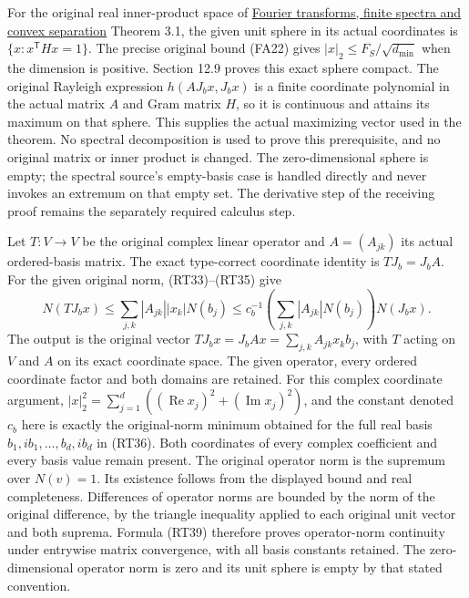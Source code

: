 \documentclass[
  11pt,
]{article}
\begin{document}
For the original real inner-product space of
\href{prerequisite-bridges.pdf}{Fourier transforms, finite spectra and
convex separation} Theorem 3.1, the given unit sphere in its actual
coordinates is \(\{x:x^{\mathsf T}Hx=1\}\). The precise original bound
(FA22) gives \(|x|_2\le F_S/\sqrt{d_{\min}}\) when the dimension is
positive. Section 12.9 proves this exact sphere compact. The original
Rayleigh expression \(h(AJ_bx,J_bx)\) is a finite coordinate polynomial
in the actual matrix \(A\) and Gram matrix \(H\), so it is continuous
and attains its maximum on that sphere. This supplies the actual
maximizing vector used in the theorem. No spectral decomposition is used
to prove this prerequisite, and no original matrix or inner product is
changed. The zero-dimensional sphere is empty; the spectral source's
empty-basis case is handled directly and never invokes an extremum on
that empty set. The derivative step of the receiving proof remains the
separately required calculus step.

Let \(T:V\to V\) be the original complex linear operator and
\(A=(A_{jk})\) its actual ordered-basis matrix. The exact type-correct
coordinate identity is \(TJ_b=J_bA\). For the given original norm,
(RT33)--(RT35) give \[
N(TJ_bx)
\le\sum_{j,k}|A_{jk}||x_k|N(b_j)
\le c_b^{-1}\left(\sum_{j,k}|A_{jk}|N(b_j)\right)N(J_bx).
\tag{RT39}
\] The output is the original vector
\(TJ_bx=J_bAx=\sum_{j,k}A_{jk}x_kb_j\), with \(T\) acting on \(V\) and
\(A\) on its exact coordinate space. The given operator, every ordered
coordinate factor and both domains are retained. For this complex
coordinate argument,
\(|x|_2^2=\sum_{j=1}^d((\operatorname{Re}x_j)^2+(\operatorname{Im}x_j)^2)\),
and the constant denoted \(c_b\) here is exactly the original-norm
minimum obtained for the full real basis \(b_1,ib_1,\ldots,b_d,ib_d\) in
(RT36). Both coordinates of every complex coefficient and every basis
value remain present. The original operator norm is the supremum over
\(N(v)=1\). Its existence follows from the displayed bound and real
completeness. Differences of operator norms are bounded by the norm of
the original difference, by the triangle inequality applied to each
original unit vector and both suprema. Formula (RT39) therefore proves
operator-norm continuity under entrywise matrix convergence, with all
basis constants retained. The zero-dimensional operator norm is zero and
its unit sphere is empty by that stated convention.
\end{document}
